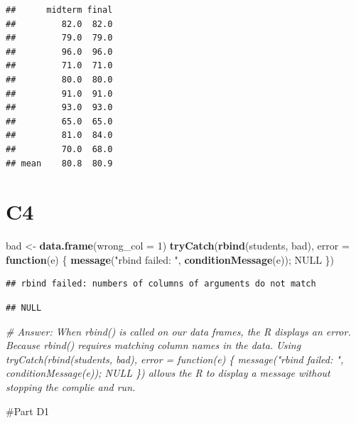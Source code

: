 \documentclass[
]{article}
\newenvironment{Shaded}{\begin{snugshade}}{\end{snugshade}}
\newcommand{\AttributeTok}[1]{\textcolor[rgb]{0.13,0.29,0.53}{#1}}
\newcommand{\CommentTok}[1]{\textcolor[rgb]{0.56,0.35,0.01}{\textit{#1}}}
\newcommand{\ConstantTok}[1]{\textcolor[rgb]{0.56,0.35,0.01}{#1}}
\newcommand{\ControlFlowTok}[1]{\textcolor[rgb]{0.13,0.29,0.53}{\textbf{#1}}}
\newcommand{\DecValTok}[1]{\textcolor[rgb]{0.00,0.00,0.81}{#1}}
\newcommand{\FunctionTok}[1]{\textcolor[rgb]{0.13,0.29,0.53}{\textbf{#1}}}
\newcommand{\NormalTok}[1]{#1}
\newcommand{\OtherTok}[1]{\textcolor[rgb]{0.56,0.35,0.01}{#1}}
\newcommand{\SpecialCharTok}[1]{\textcolor[rgb]{0.81,0.36,0.00}{\textbf{#1}}}
\newcommand{\StringTok}[1]{\textcolor[rgb]{0.31,0.60,0.02}{#1}}
\begin{document}
\begin{verbatim}
##      midterm final
##         82.0  82.0
##         79.0  79.0
##         96.0  96.0
##         71.0  71.0
##         80.0  80.0
##         91.0  91.0
##         93.0  93.0
##         65.0  65.0
##         81.0  84.0
##         70.0  68.0
## mean    80.8  80.9
\end{verbatim}

\section{C4}\label{c4}

\begin{Shaded}
\begin{Highlighting}[]
\NormalTok{bad }\OtherTok{\textless{}{-}} \FunctionTok{data.frame}\NormalTok{(}\AttributeTok{wrong\_col =} \DecValTok{1}\NormalTok{)}
\FunctionTok{tryCatch}\NormalTok{(}\FunctionTok{rbind}\NormalTok{(students, bad), }\AttributeTok{error =} \ControlFlowTok{function}\NormalTok{(e) \{ }\FunctionTok{message}\NormalTok{(}\StringTok{"rbind failed: "}\NormalTok{, }\FunctionTok{conditionMessage}\NormalTok{(e)); }\ConstantTok{NULL}\NormalTok{ \})}
\end{Highlighting}
\end{Shaded}

\begin{verbatim}
## rbind failed: numbers of columns of arguments do not match
\end{verbatim}

\begin{verbatim}
## NULL
\end{verbatim}

\begin{Shaded}
\begin{Highlighting}[]
\CommentTok{\# Answer: When rbind() is called on our data frames, the R displays an error. Because rbind() requires matching column names in the data. Using tryCatch(rbind(students, bad), error = function(e) \{ message("rbind failed: ", conditionMessage(e)); NULL \}) allows the R to display a message without stopping the complie and run.}
\end{Highlighting}
\end{Shaded}

\#Part D1

\begin{Shaded}
\end{Shaded}
\end{document}

